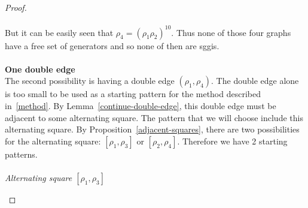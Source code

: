 \begin{proof}
\paragraph{}
But it can be easily seen that $\rho_4 = (\rho_1 \rho_2)^{10}$. Thus none of those four graphs have a free set of generators and so none of then are sggis.

\paragraph{}
\textbf{One double edge}\\
The second possibility is having a double edge $(\rho_1, \rho_4)$. The double edge alone is too small to be used as a starting pattern for the method described in~\ref{method}. By Lemma~\ref{continue-double-edge}, this double edge must be adjacent to some alternating square. The pattern that we will choose include this alternating square. By Proposition~\ref{adjacent-squares}, there are two possibilities for the alternating square: $[\rho_1, \rho_3]$ or $[\rho_2, \rho_4]$. Therefore we have 2 starting patterns.

\paragraph{}
\textit{Alternating square $[\rho_1, \rho_3]$}

\begin{figure}[H]
  \begin{center}
\end{center}
\end{figure}
\end{proof}
